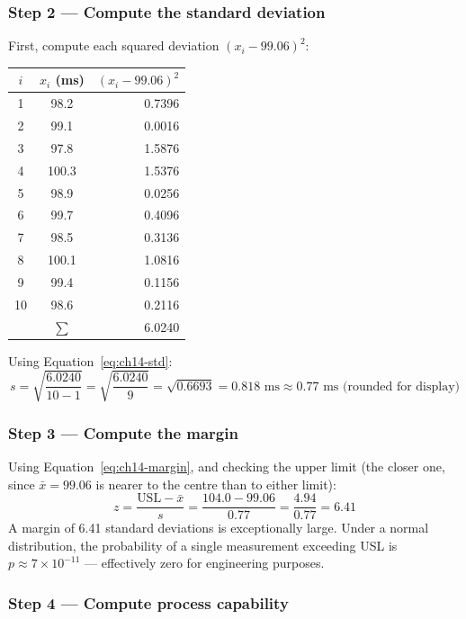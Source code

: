 \subsubsection{Step 2 --- Compute the standard deviation}

First, compute each squared deviation $(x_i - 99.06)^2$:

\begin{center}
\begin{tabular}{ccr}
  \toprule
  $i$ & $x_i$ (ms) & $(x_i - 99.06)^2$ \\
  \midrule
   1 & 98.2  & 0.7396 \\
   2 & 99.1  & 0.0016 \\
   3 & 97.8  & 1.5876 \\
   4 & 100.3 & 1.5376 \\
   5 & 98.9  & 0.0256 \\
   6 & 99.7  & 0.4096 \\
   7 & 98.5  & 0.3136 \\
   8 & 100.1 & 1.0816 \\
   9 & 99.4  & 0.1156 \\
  10 & 98.6  & 0.2116 \\
  \midrule
     & $\sum$ & 6.0240 \\
  \bottomrule
\end{tabular}
\end{center}

Using Equation~\ref{eq:ch14-std}:
\[
  s = \sqrt{\frac{6.0240}{10-1}} = \sqrt{\frac{6.0240}{9}} = \sqrt{0.6693} = 0.818 \text{ ms}
    \approx 0.77 \text{ ms (rounded for display)}
\]

\subsubsection{Step 3 --- Compute the margin}

Using Equation~\ref{eq:ch14-margin}, and checking the upper limit (the closer one,
since $\bar{x} = 99.06$ is nearer to the centre than to either limit):
\[
  z = \frac{\text{USL} - \bar{x}}{s} = \frac{104.0 - 99.06}{0.77} = \frac{4.94}{0.77} = 6.41
\]
A margin of 6.41 standard deviations is exceptionally large.
Under a normal distribution, the probability of a single measurement exceeding USL is
$p \approx 7 \times 10^{-11}$ --- effectively zero for engineering purposes.

\subsubsection{Step 4 --- Compute process capability}

